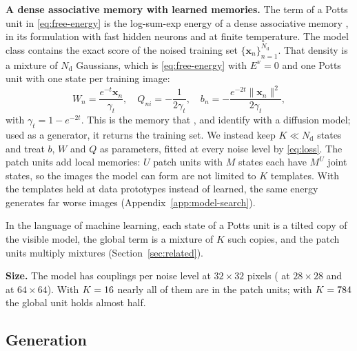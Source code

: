\documentclass{article}
\newif\ifshownotes
\newcommand{\todo}[1]{\ifshownotes\textcolor{tbdcolor}{[TODO: #1]}\fi}
\newcommand{\x}{\bm{x}}
\newcommand{\Evis}{E^{\mathrm{v}}}
\begin{document}
\textbf{A dense associative memory with learned memories.}
The term of a Potts unit in \eqref{eq:free-energy} is the log-sum-exp energy of
a dense associative memory
\citep{krotov2016dense,demircigil2017model,ramsauer2021hopfield}, in its
formulation with fast hidden neurons \citep{krotov2021large} and at finite
temperature. The model class contains the exact score of the noised training
set $\{\x_n\}_{n=1}^{N_{\mathrm{d}}}$. That density is a mixture of
$N_{\mathrm d}$ Gaussians, which is \eqref{eq:free-energy} with $\Evis=0$ and
one Potts unit with one state per training image:
\begin{equation}
  W_n=\frac{e^{-t}\x_n}{\gamma_t},\quad
  Q_{ni}=-\frac{1}{2\gamma_t},\quad
  b_n=-\frac{e^{-2t}\lVert\x_n\rVert^{2}}{2\gamma_t},
  \label{eq:stored}
\end{equation}
with $\gamma_t=1-e^{-2t}$. This is the memory that
\citet{hoover2023memory}, \citet{ambrogioni2024search} and
\citet{pham2026emergence} identify with a diffusion model; used as a
generator, it returns the training set. We instead keep
$K\ll N_{\mathrm d}$ states and treat $b$, $W$ and $Q$ as parameters, fitted
at every noise level by \eqref{eq:loss}. The patch units add local memories:
$U$ patch units with $M$ states each have $M^{U}$ joint states, so the images
the model can form are not limited to $K$ templates.
With the templates held at data prototypes instead of learned, the same energy
generates far worse images (Appendix~\ref{app:model-search}).
\todo{that comparison (FID 147 against 34 and 22, CelebA $32\times32$) is from
an earlier, larger model: label it so, or repeat it on the locked model.}
In the language of machine learning, each state of a Potts unit is a tilted
copy of the visible model, the global term is a mixture of $K$ such copies,
and the patch units multiply mixtures (Section~\ref{sec:related}).

\textbf{Size.}
The model has \paramsCelebLow{} couplings per noise level at $32\times32$
pixels (\paramsSmall{} at $28\times28$ and \paramsCelebHigh{} at
$64\times64$). With $K=\Kglobal$ nearly all of them are in the patch units;
with $K=\KglobalClasses$ the global unit holds almost half.
\todo{counts to confirm with the code: my count from the unit sizes is
2.24\,M at $32\times32$ with $K=\Kglobal$ (the notebook says about 2.4\,M) and
2.75\,M at $28\times28$ with $K=\KglobalClasses$.}

\subsection{Generation}
\end{document}
